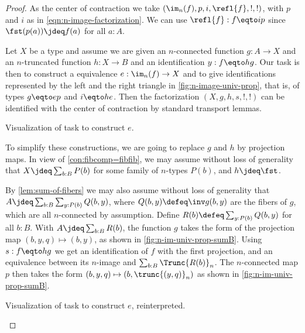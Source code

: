 \begin{proof}
As the center of contraction we take $(\im_n(f),p,i,\refl{f},!,!)$,
with $p$ and $i$ as in \cref{eqn:n-image-factorization}.
We can use $\refl{f} : f \eqto ip$ since $\fst(p(a))\jdeq f(a)$ for all $a:A$.

Let $X$ be a type and assume we are given an $n$-connected
function $g:A\to X$ and an $n$-truncated function $h:X\to B$
and an identification $y:f\eqto hg$. Our task is
then to construct a equivalence $e: \im_n(f)\to X$
and to give identifications represented by the left
and the right triangle in \cref{fig:n-image-univ-prop},
that is, of types $g\eqto ep$ and $i\eqto he$.
Then the factorization $(X,g,h,s,!,!)$ can be identified
with the center of contraction by standard transport lemmas.

\begin{marginfigure}
\noindent{}
\caption{Visualization of task to construct $e$.}
\label{fig:n-image-univ-prop}
\end{marginfigure}

To simplify these constructions,
we are going to replace $g$ and $h$ by projection maps.
In view of \cref{con:fibcomp=fibfib}, we may assume without
loss of generality that $X\jdeq \sum_{b:B} P(b)$ for some
family of $n$-types $P(b)$, and $h\jdeq\fst$.

By \cref{lem:sum-of-fibers} we may also assume without
loss of generality that
$A\jdeq\sum_{b:B}\sum_{y:P(b)} Q(b,y)$, where
$Q(b,y) \defeq\inv g (b,y)$ are the fibers of $g$,
which are all $n$-connected by assumption.
Define $R(b)\defeq\sum_{y:P(b)} Q(b,y)$ for all $b:B$.
With $A\jdeq \sum_{b:B} R(b)$, the function $g$
takes the form of the projection map $(b,y,q)\mapsto(b,y)$,
as shown in \cref{fig:n-im-univ-prop-sumB}.
Using $s: f\eqto hg$ we get an identification of $f$ with the first projection,
and an equivalence between its $n$-image and $\sum_{b:B} \Trunc{R(b)}_n$.
The $n$-connected map $p$ then takes the form
$(b,y,q)\mapsto(b,\trunc{(y,q)}_n)$ as shown in
\cref{fig:n-im-univ-prop-sumB}.

\begin{marginfigure}
  \noindent{}
\caption{Visualization of task to construct $e$, reinterpreted.}
\label{fig:n-im-univ-prop-sumB}
\end{marginfigure}



\end{proof}
